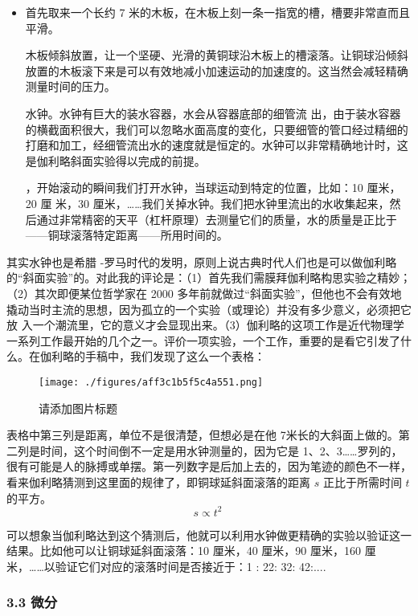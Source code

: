 \begin{itemize}
\item 首先取来⼀个长约 7 米的⽊板，在⽊板上刻⼀条⼀指宽的槽，槽要非常直⽽且平滑。

⽊板倾斜放置，让⼀个坚硬、光滑的黄铜球沿⽊板上的槽滚落。让铜球沿倾斜放置的⽊板滚下来是可以有效地减小加速运动的加速度的。这当然会减轻精确测量时间的压⼒。

⽔钟。⽔钟有巨⼤的装⽔容器，⽔会从容器底部的细管流
出，由于装⽔容器的横截面积很⼤，我们可以忽略⽔面⾼度的变化，只要细管的管⼝经过精细的打磨和加⼯，经细管流出⽔的速度就是恒定的。⽔钟可以非常精确地计时，这是伽利略斜面实验得以完成的前提。

，开始滚动的瞬间我们打开⽔钟，当球运动到特定的位置，比如：10 厘米，20 厘
米，30 厘米，……我们关掉⽔钟。我们把⽔钟里流出的⽔收集起来，然后通过非常精密的天平（杠杆原理）去测量它们的质量，⽔的质量是正比于——铜球滚落特定距离——所用时间的。
\end{itemize}

其实⽔钟也是希腊 -罗马时代的发明，原则上说古典时代⼈们也是可以做伽利略的“斜面实验”的。对此我的评论是：（1）首先我们需膜拜伽利略构思实验之精妙；（2）其次即便某位哲学家在 2000 多年前就做过“斜面实验”，但他也不会有效地撬动当时主流的思想，因为孤立的⼀个实验（或理论）并没有多少意义，必须把它放
⼊⼀个潮流里，它的意义才会显现出来。（3）伽利略的这项⼯作是近代物理学⼀系列⼯作最开始的⼏个之⼀。评价⼀项实验，⼀个⼯作，重要的是看它引发了什么。在伽利略的⼿稿中，我们发现了这么⼀个表格：

\begin{figure}[ht]
\centering
\texttt{[image: ./figures/aff3c1b5f5c4a551.png]}
\caption{请添加图片标题} \label{fig_AtomId_11}
\end{figure}

表格中第三列是距离，单位不是很清楚，但想必是在他 7米长的⼤斜面上做的。第⼆列是时间，这个时间倒不⼀定是用⽔钟测量的，因为它是 1、2、3……罗列的，很有可能是⼈的脉搏或单摆。第⼀列数字是后加上去的，因为笔迹的颜⾊不⼀样，看来伽利略猜测到这里面的规律了，即铜球延斜面滚落的距离 $s$ 正比于所需时间 $t$ 的平⽅。
\begin{equation}
s \propto t^2~
\end{equation}

可以想象当伽利略达到这个猜测后，他就可以利用⽔钟做更精确的实验以验证这⼀结果。比如他可以让铜球延斜面滚落：10 厘米，40 厘米，90 厘米，160 厘米，……以验证它们对应的滚落时间是否接近于：1 : 22: 32: 42:....

\subsubsection{3.3 微分}

